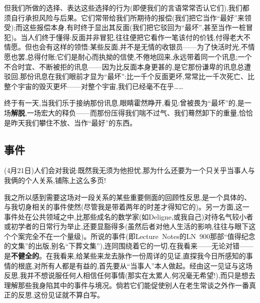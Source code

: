 但我们所做的选择、表达这些选择的行为(即便我们的言语常常否认它们),我们都须自行承担风险与后果。它们常带给我们所期待的报偿(我们把它当作“最好”来领受);而这些报偿本身,有时终于显出其反面(我们把它驳回为“最坏”,甚至当作一桩冒犯)。当人们终于懂得:反面并非冒犯,往往便把它看作一笔该付的价钱,付得老大不情愿。但也会有这样的领悟:某些反面,并不是无情的收银员——为了快活时光,不情愿也罢,总得付账;它们是耐心而执拗的信使,不倦地回来,永远带着同一个讯息;一个不合时宜、不断被拒的讯息——因为比反面本身更甚的,是它那份谦卑的讯息总遭驳回,那份讯息在我们眼前才显为“最坏”:比一千个反面更坏,常常比一千次死亡、比整个宇宙的毁灭更坏——对整个宇宙,我们已经毫不在乎……

\dmark{}终于有一天,当我们乐于接纳那份讯息,眼睛霍然睁开,看见:曾被畏为“最坏”的,是一场\textbf{解脱},一场宏大的释负——而那份压得我们喘不过气、我们蓦然卸下的重量,恰恰是昨天我们攀住不放、当作“最好”的东西。


\subsection{事件}


(4月21日)人们会对我说:既然我无须为他担忧,那为什么还要为一个只关乎当事人与我俩的个人关系,铺陈上这么多页!

我之所以感到需要这场对一段关系的某些重要侧面的回顾性反思,是一个具体的、与我切身相关的事件使然(尽管我是带着两年的时差才得知它的)。另一方面,这一事件处在公共领域之中,比那些成名的数学家(如Deligne,或我自己)对待名气较小者或初学者的日常行为举止,还要显豁得多(虽然后者对他人生活的影响,往往与眼下这个个案完全不在一个量级)。所说的事件(即Lecture~Notes的LN~900那部“值得纪念的文集”的出版,别名“下葬文集”),连同围绕着它的一切,在我看来——无论对错——是\textbf{不健全的}。在我看来,给某些来龙去脉作一份周详的见证,直探我今日所感知的事情的根底,对所有人都是有益的,首先要从“当事人”本人做起。经由这一见证与这场反思,我并不想说服任何人相信任何事情(那实在太累人,何况毫无希望!),而只是想去理解那些我身陷其中的事件与境况。倘若它们能促使别人在老生常谈之外作一番真正的反思,这份见证就不算白写。

